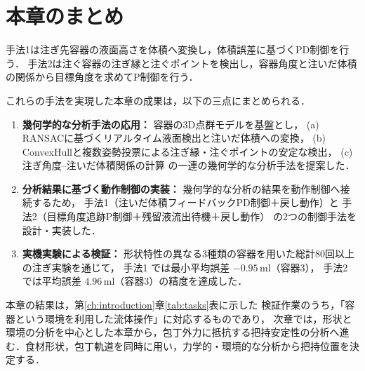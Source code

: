 \section{本章のまとめ}
\label{sec:pour_summary}

手法1は注ぎ先容器の液面高さを体積へ変換し，体積誤差に基づくPD制御を行う．
手法2は注ぐ容器の注ぎ縁と注ぐポイントを検出し，容器角度と注いだ体積の関係から目標角度を求めてP制御を行う．

これらの手法を実現した本章の成果は，以下の三点にまとめられる．
\begin{enumerate}
  \item \textbf{幾何学的な分析手法の応用：} 
    容器の3D点群モデルを基盤とし，
    (a) RANSACに基づくリアルタイム液面検出と注いだ体積への変換，
    (b) ConvexHullと複数姿勢投票による注ぎ縁・注ぐポイントの安定な検出，
    (c) 注ぎ角度--注いだ体積関係の計算
    の一連の幾何学的な分析手法を提案した．
  \item \textbf{分析結果に基づく動作制御の実装：}
    幾何学的な分析の結果を動作制御へ接続するため，
    手法1（注いだ体積フィードバックPD制御＋戻し動作）と
    手法2（目標角度追跡P制御＋残留液流出待機＋戻し動作）
    の2つの制御手法を設計・実装した．
  \item \textbf{実機実験による検証：}
    形状特性の異なる3種類の容器を用いた総計80回以上の注ぎ実験を通じて，
    手法1 では最小平均誤差 $-0.95\,\mathrm{ml}$（容器3），
    手法2 では平均誤差 $4.96\,\mathrm{ml}$（容器3）の精度を達成した．
\end{enumerate}

本章の結果は，第\ref{ch:introduction}章\ref{tab:tasks}表に示した
検証作業のうち，「容器という環境を利用した流体操作」に対応するものであり，
次章では，形状と環境の分析を中心とした本章から，包丁外力に抵抗する把持安定性の分析へ進む．食材形状，包丁軌道を同時に用い，力学的・環境的な分析から把持位置を決定する．

